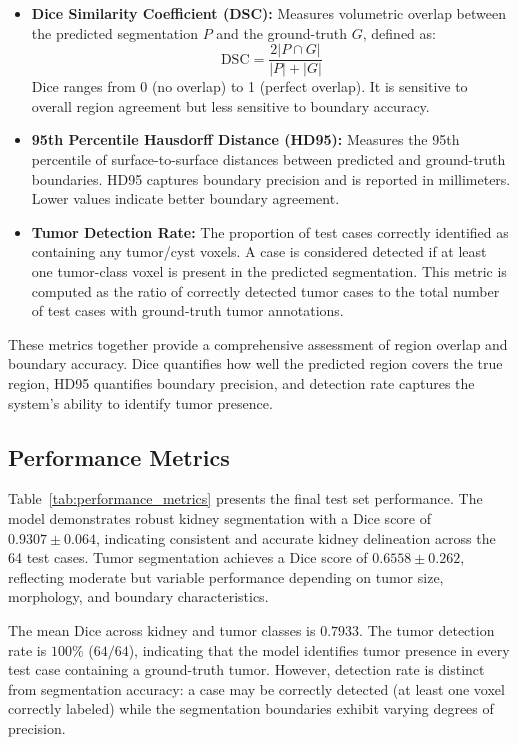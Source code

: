 \begin{itemize}
    \item \textbf{Dice Similarity Coefficient (DSC):} Measures volumetric overlap between the predicted segmentation $P$ and the ground-truth $G$, defined as:
    \begin{equation}
    \text{DSC} = \frac{2 |P \cap G|}{|P| + |G|}
    \end{equation}
    Dice ranges from 0 (no overlap) to 1 (perfect overlap). It is sensitive to overall region agreement but less sensitive to boundary accuracy.
    
    \item \textbf{95th Percentile Hausdorff Distance (HD95):} Measures the 95th percentile of surface-to-surface distances between predicted and ground-truth boundaries. HD95 captures boundary precision and is reported in millimeters. Lower values indicate better boundary agreement.
    
    \item \textbf{Tumor Detection Rate:} The proportion of test cases correctly identified as containing any tumor/cyst voxels. A case is considered detected if at least one tumor-class voxel is present in the predicted segmentation. This metric is computed as the ratio of correctly detected tumor cases to the total number of test cases with ground-truth tumor annotations.
\end{itemize}

These metrics together provide a comprehensive assessment of region overlap and boundary accuracy. Dice quantifies how well the predicted region covers the true region, HD95 quantifies boundary precision, and detection rate captures the system's ability to identify tumor presence.

\subsection{Performance Metrics}



Table~\ref{tab:performance_metrics} presents the final test set performance. The model demonstrates robust kidney segmentation with a Dice score of $0.9307 \pm 0.064$, indicating consistent and accurate kidney delineation across the 64 test cases. Tumor segmentation achieves a Dice score of $0.6558 \pm 0.262$, reflecting moderate but variable performance depending on tumor size, morphology, and boundary characteristics.

The mean Dice across kidney and tumor classes is $0.7933$. The tumor detection rate is $100\%$ ($64/64$), indicating that the model identifies tumor presence in every test case containing a ground-truth tumor. However, detection rate is distinct from segmentation accuracy: a case may be correctly detected (at least one voxel correctly labeled) while the segmentation boundaries exhibit varying degrees of precision.

